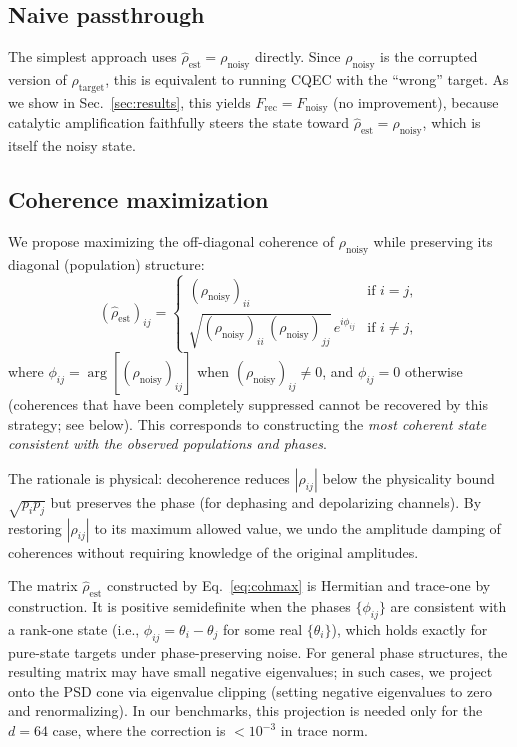 \documentclass[pra,twocolumn,superscriptaddress,longbibliography,floatfix,nofootinbib]{revtex4-2}
\newcommand{\Frec}{F_\mathrm{rec}}
\newcommand{\Fnoisy}{F_\mathrm{noisy}}
\newcommand{\rhot}{\rho_\mathrm{target}}
\newcommand{\rhon}{\rho_\mathrm{noisy}}
\newcommand{\rhoe}{\hat{\rho}_\mathrm{est}}
\begin{document}
\subsection{Naive passthrough}
\label{sec:naive}

The simplest approach uses $\rhoe = \rhon$ directly.
Since $\rhon$ is the corrupted version of $\rhot$, this is equivalent to running CQEC with the ``wrong'' target.
As we show in Sec.~\ref{sec:results}, this yields $\Frec = \Fnoisy$ (no improvement), because catalytic amplification faithfully steers the state toward $\rhoe = \rhon$, which is itself the noisy state.

\subsection{Coherence maximization}
\label{sec:cohmax}

We propose maximizing the off-diagonal coherence of $\rhon$ while preserving its diagonal (population) structure:
\begin{equation}
(\rhoe)_{ij} = \begin{cases}
(\rhon)_{ii} & \text{if } i = j, \\
\sqrt{(\rhon)_{ii}\,(\rhon)_{jj}}\,e^{i\phi_{ij}} & \text{if } i \neq j,
\end{cases}
\label{eq:cohmax}
\end{equation}
where $\phi_{ij} = \arg[(\rhon)_{ij}]$ when $(\rhon)_{ij} \neq 0$, and $\phi_{ij} = 0$ otherwise (coherences that have been completely suppressed cannot be recovered by this strategy; see below).
This corresponds to constructing the \emph{most coherent state consistent with the observed populations and phases}.

The rationale is physical: decoherence reduces $|\rho_{ij}|$ below the physicality bound $\sqrt{p_i p_j}$ but preserves the phase (for dephasing and depolarizing channels).
By restoring $|\rho_{ij}|$ to its maximum allowed value, we undo the amplitude damping of coherences without requiring knowledge of the original amplitudes.

The matrix $\rhoe$ constructed by Eq.~\eqref{eq:cohmax} is Hermitian and trace-one by construction.
It is positive semidefinite when the phases $\{\phi_{ij}\}$ are consistent with a rank-one state (i.e., $\phi_{ij} = \theta_i - \theta_j$ for some real $\{\theta_i\}$), which holds exactly for pure-state targets under phase-preserving noise.
For general phase structures, the resulting matrix may have small negative eigenvalues; in such cases, we project onto the PSD cone via eigenvalue clipping (setting negative eigenvalues to zero and renormalizing).
In our benchmarks, this projection is needed only for the $d = 64$ case, where the correction is $< 10^{-3}$ in trace norm.
\end{document}
